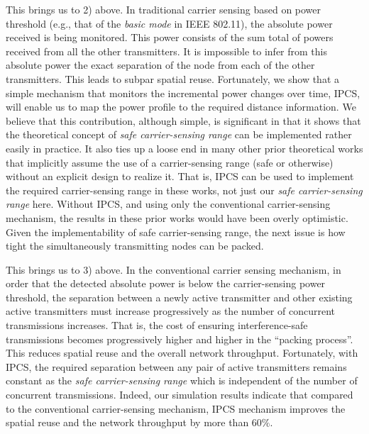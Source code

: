 \documentclass[conference]{IEEEtran}
\begin{document}
This brings us to 2) above. In traditional carrier sensing based on
power threshold (e.g., that of the \emph{basic mode} in IEEE
802.11), the absolute power received is being monitored. This power
consists of the sum total of powers received from all the other
transmitters. It is impossible to infer from this absolute power the
exact separation of the node from each of the other transmitters.
This leads to subpar spatial reuse. Fortunately, we show that a
simple mechanism that monitors the incremental power changes over
time, IPCS, will enable us to map the power prof\/ile to the
required distance information. We believe that this contribution,
although simple, is signif\/icant in that it shows that the
theoretical concept of \emph{safe carrier-sensing range} can be
implemented rather easily in practice. It also ties up a loose end
in many other prior theoretical works that implicitly assume the use
of a carrier-sensing range (safe or otherwise) without an explicit
design to realize it. That is, IPCS can be used to implement the
required carrier-sensing range in these works, not just our
\emph{safe carrier-sensing range} here. Without IPCS, and using only
the conventional carrier-sensing mechanism, the results in these
prior works would have been overly optimistic. Given the
implementability of safe carrier-sensing range, the next issue is
how tight the simultaneously transmitting nodes can be packed.



This brings us to 3) above. In the conventional carrier sensing
mechanism, in order that the detected absolute power is below the
carrier-sensing power threshold, the separation between a newly
active transmitter and other existing active transmitters must
increase progressively as the number of concurrent transmissions
increases. That is, the cost of ensuring interference-safe
transmissions becomes progressively higher and higher in the
``packing process''. This reduces spatial reuse and the overall
network throughput. Fortunately, with IPCS, the required separation
between any pair of active transmitters remains constant as the
\emph{safe carrier-sensing range} which is independent of the number
of concurrent transmissions. Indeed, our simulation results indicate
that compared to the conventional carrier-sensing mechanism, IPCS
mechanism improves the spatial reuse and the network throughput by
more than $60\%$.
\end{document}

